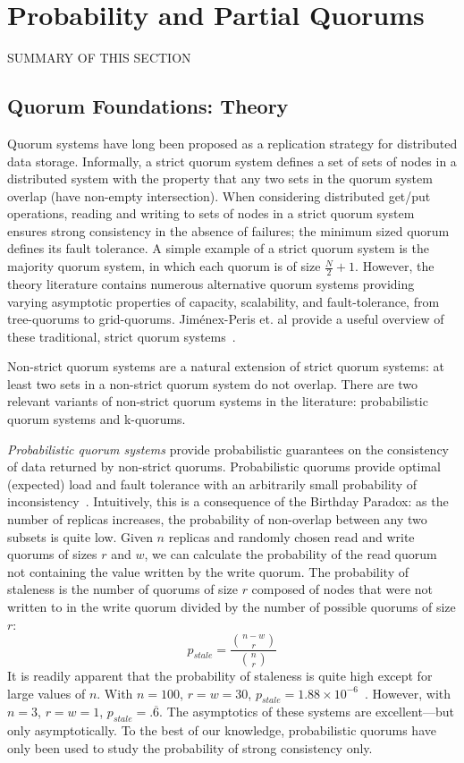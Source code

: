 \documentclass{vldb}
\begin{document}
\section{Probability and Partial Quorums}
\label{sec:theory}

SUMMARY OF THIS SECTION

\subsection{Quorum Foundations: Theory}

Quorum systems have long been proposed as a replication strategy for
distributed data storage.  Informally, a strict quorum system defines
a set of sets of nodes in a distributed system with the property that
any two sets in the quorum system overlap (have non-empty
intersection).  When considering distributed get/put operations,
reading and writing to sets of nodes in a strict quorum system ensures
strong consistency in the absence of failures; the minimum sized
quorum defines its fault tolerance.  A simple example of a strict
quorum system is the majority quorum system, in which each quorum is
of size $\frac{N}{2}+1$.  However, the theory literature contains
numerous alternative quorum systems providing varying asymptotic
properties of capacity, scalability, and fault-tolerance, from
tree-quorums to grid-quorums.  Jim\'{e}nex-Peris et. al provide a
useful overview of these traditional, strict quorum
systems~\cite{quorums-alternative}.

Non-strict quorum systems are a natural extension of strict quorum
systems: at least two sets in a non-strict quorum system do not
overlap.  There are two relevant variants of non-strict quorum systems in
the literature: probabilistic quorum systems and k-quorums.

\textit{Probabilistic quorum systems} provide probabilistic guarantees
on the consistency of data returned by non-strict quorums.
Probabilistic quorums provide optimal (expected) load and fault
tolerance with an arbitrarily small probability of
inconsistency~\cite{prob-quorum}.  Intuitively, this is a consequence
of the Birthday Paradox: as the number of replicas increases, the
probability of non-overlap between any two subsets is quite low.
Given $n$ replicas and randomly chosen read and write quorums of sizes
$r$ and $w$, we can calculate the probability of the read quorum not
containing the value written by the write quorum.  The probability of
staleness is the number of quorums of size $r$ composed of nodes that
were not written to in the write quorum divided by the number of
possible quorums of size $r$:
\begin{equation}
\label{eq:prob-strict}
p_{stale}=\frac{{n-w \choose r}}{{n \choose r}}
\end{equation}
It is readily apparent that the probability of staleness is quite high
except for large values of $n$.  With $n=100$, $r=w=30$, $p_{stale} =
1.88 \times 10^{-6}$~\cite{nonstrict-availability}.  However, with
$n=3$, $r=w=1$, $p_{stale} = .\overline{6}$.  The asymptotics of these
systems are excellent---but only asymptotically.  To the best of our
knowledge, probabilistic quorums have only been used to study the
probability of strong consistency only.
\end{document}
